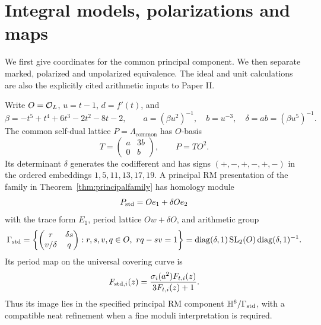 \section{Integral models, polarizations and maps}
We first give coordinates for the common principal component. We then
separate marked, polarized and unpolarized equivalence. The ideal and unit
calculations are also the explicitly cited arithmetic inputs to Paper II.


\begin{proposition}
\label{pp:prop:explicit}
Write $O=\mathcal O_L$, $u=t-1$, $d=f'(t)$, and
\[
 \beta=-t^5+t^4+6t^3-2t^2-8t-2,\qquad
 a=(\beta u^2)^{-1},\quad b=u^{-3},\quad
 \delta=ab=(\beta u^5)^{-1}.
\]
The common self-dual lattice $P=\Lambda_{\mathrm{common}}$ has $O$-basis
\begin{equation}\label{pp:eq:basis}
 T=\begin{pmatrix}a&3b\\0&b\end{pmatrix},\qquad P=TO^2.
\end{equation}
Its determinant $\delta$ generates the codifferent and has signs
$(+,-,+,-,+,-)$ in the ordered embeddings $1,5,11,13,17,19$.
A principal RM presentation of the family in
Theorem~\ref{thm:principalfamily} has homology module
\[
 P_{\rm std}=Oe_1+\delta Oe_2
\]
with the trace form $E_1$, period lattice $Ow+\delta O$, and arithmetic group
\begin{equation}\label{pp:eq:group}
 \Gamma_{\rm std}
 =\left\{\begin{pmatrix}r&\delta s\\v/\delta&q\end{pmatrix}:
 r,s,v,q\in O,\ rq-sv=1\right\}
 =\operatorname{diag}(\delta,1)\operatorname{SL}_2(O)
   \operatorname{diag}(\delta,1)^{-1}.
\end{equation}
Its period map on the universal covering curve is
\begin{equation}\label{pp:eq:curve}
 F_{{\rm std},i}(z)
 =\frac{\sigma_i(a^2)F_{t,i}(z)}{3F_{t,i}(z)+1}.
\end{equation}
Thus its image lies in the specified principal RM component
$\mathbb H^6/\Gamma_{\rm std}$, with a compatible neat refinement when a fine
moduli interpretation is required.
\end{proposition}
